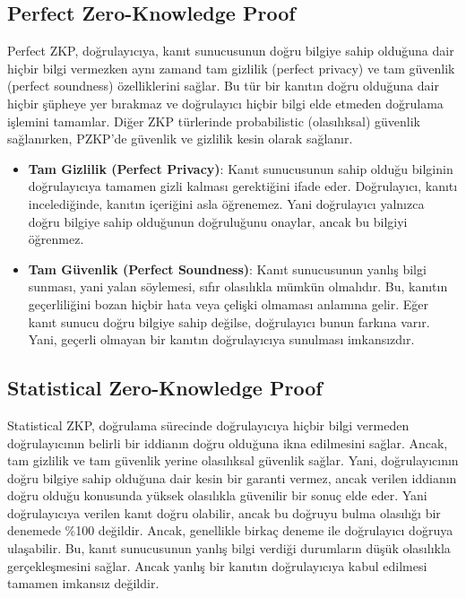 \newpage

\subsection{Perfect Zero-Knowledge Proof}

Perfect ZKP, doğrulayıcıya, kanıt sunucusunun doğru bilgiye sahip olduğuna dair hiçbir bilgi vermezken aynı zamand tam gizlilik (perfect privacy) ve tam güvenlik (perfect soundness) özelliklerini sağlar. Bu tür bir kanıtın doğru olduğuna dair hiçbir şüpheye yer bırakmaz ve doğrulayıcı hiçbir bilgi elde etmeden doğrulama işlemini tamamlar. Diğer ZKP türlerinde probabilistic (olasılıksal) güvenlik sağlanırken, PZKP'de güvenlik ve gizlilik kesin olarak sağlanır.

\begin{itemize}
    \item \textbf{Tam Gizlilik (Perfect Privacy)}: Kanıt sunucusunun sahip olduğu bilginin doğrulayıcıya tamamen gizli kalması gerektiğini ifade eder. Doğrulayıcı, kanıtı incelediğinde, kanıtın içeriğini asla öğrenemez. Yani doğrulayıcı yalnızca doğru bilgiye sahip olduğunun doğruluğunu onaylar, ancak bu bilgiyi öğrenmez.
    \item \textbf{Tam Güvenlik (Perfect Soundness)}: Kanıt sunucusunun yanlış bilgi sunması, yani yalan söylemesi, sıfır olasılıkla mümkün olmalıdır. Bu, kanıtın geçerliliğini bozan hiçbir hata veya çelişki olmaması anlamına gelir. Eğer kanıt sunucu doğru bilgiye sahip değilse, doğrulayıcı bunun farkına varır. Yani, geçerli olmayan bir kanıtın doğrulayıcıya sunulması imkansızdır.
\end{itemize}

\newpage

\subsection{Statistical Zero-Knowledge Proof}

Statistical ZKP, doğrulama sürecinde doğrulayıcıya hiçbir bilgi vermeden doğrulayıcının belirli bir iddianın doğru olduğuna ikna edilmesini sağlar. Ancak, tam gizlilik ve tam güvenlik yerine olasılıksal güvenlik sağlar. Yani, doğrulayıcının doğru bilgiye sahip olduğuna dair kesin bir garanti vermez, ancak verilen iddianın doğru olduğu konusunda yüksek olasılıkla güvenilir bir sonuç elde eder. Yani doğrulayıcıya verilen kanıt doğru olabilir, ancak bu doğruyu bulma olasılığı bir denemede \%100 değildir. Ancak, genellikle birkaç deneme ile doğrulayıcı doğruya ulaşabilir. Bu, kanıt sunucusunun yanlış bilgi verdiği durumların düşük olasılıkla gerçekleşmesini sağlar. Ancak yanlış bir kanıtın doğrulayıcıya kabul edilmesi tamamen imkansız değildir.

